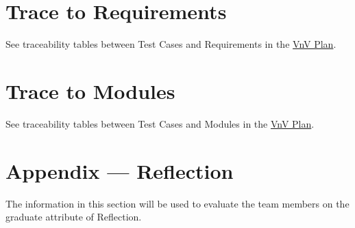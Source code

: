 \documentclass[12pt, titlepage]{article}
\begin{document}
\section{Trace to Requirements}
See traceability tables between Test Cases and Requirements in the \href{https://github.com/emilyperica/ScoreGen/blob/main/docs/VnVPlan/VnVPlan.pdf}{VnV Plan}.
		
\section{Trace to Modules}		
See traceability tables between Test Cases and Modules in the \href{https://github.com/emilyperica/ScoreGen/blob/main/docs/VnVPlan/VnVPlan.pdf}{VnV Plan}.





\newpage{}
\section*{Appendix --- Reflection}

The information in this section will be used to evaluate the team members on the
graduate attribute of Reflection.


\end{document}
